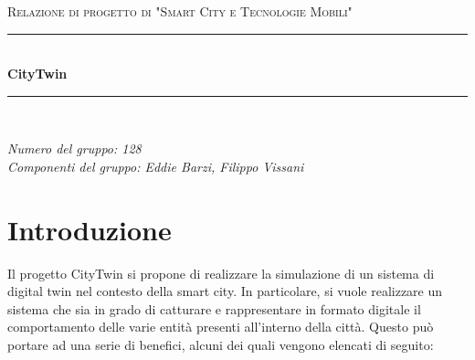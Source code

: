 \documentclass[12pt]{article}
\begin{document}
\renewcommand{\labelenumii}{\arabic{enumi}.\arabic{enumii}}
\renewcommand{\labelenumiii}{\arabic{enumi}.\arabic{enumii}.\arabic{enumiii}}
\renewcommand{\labelenumiv}{\arabic{enumi}.\arabic{enumii}.\arabic{enumiii}.\arabic{enumiv}}

\begin{titlepage}

    \newcommand{\HRule}{\rule{\linewidth}{0.5mm}}

    \center

    \textsc{\Large Relazione di progetto di "Smart City e Tecnologie Mobili"}\\[0.5cm]

    \HRule \\[0.4cm]
    { \huge \bfseries CityTwin}\\[0.4cm]
    \HRule \\[1.5cm]

    \vfill

    \begin{flushleft}
        \emph{Numero del gruppo: 128}\\[1cm]
        \emph{Componenti del gruppo: Eddie Barzi, Filippo Vissani}\\[3cm]
    \end{flushleft}

\end{titlepage}


\tableofcontents

\newpage


\section{Introduzione}

Il progetto CityTwin si propone di realizzare la simulazione di un sistema di digital twin nel contesto della smart city. In particolare, si vuole realizzare un sistema che sia in grado di catturare e rappresentare in formato digitale il comportamento delle varie entità presenti all'interno della città. Questo può portare ad una serie di benefici, alcuni dei quali vengono elencati di seguito:
\end{document}
